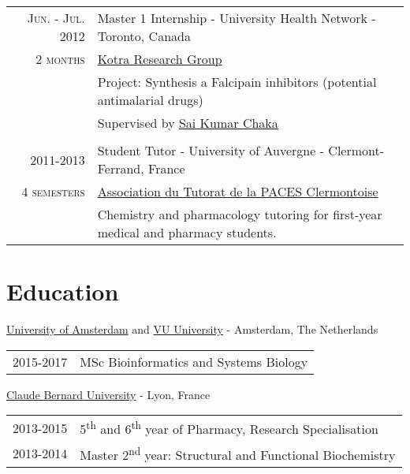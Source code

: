 \documentclass[a4paper, 10pt]{article} %
\begin{document}
\begin{tabular}{r|p{12.5cm}}

\textsc{Jun. - Jul. 2012} & Master 1 Internship - University Health Network - Toronto, Canada \\
\textsc{2 months} & \href{http://kotralab.uhnresearch.ca/}{Kotra Research Group} \\
& \footnotesize{Project: Synthesis a Falcipain inhibitors (potential antimalarial drugs)} \\
& \footnotesize{Supervised by \href{http://www.linkedin.com/in/sai-kumar-chakka-178aa215}{Sai Kumar Chaka}} \\
\multicolumn{2}{c}{} \\


\textsc{2011-2013} & Student Tutor - University of Auvergne - Clermont-Ferrand, France \\
\textsc{4 semesters} & \href{http://atpclermont.fr/atpc/}{Association du Tutorat de la PACES Clermontoise}\\
& \footnotesize{Chemistry and pharmacology tutoring for first-year medical and pharmacy students}. \\

\end{tabular}


\section{Education}

\href{http://www.uva.nl/}{University of Amsterdam} and \href{http://www.vu.nl}{VU University} - Amsterdam, The Netherlands

\begin{tabular}{ll}
\textsc{2015-2017} & MSc Bioinformatics and Systems Biology
\end{tabular}

\href{http://www.univ-lyon1.fr/}{Claude Bernard University} - Lyon, France

\begin{tabular}{ll}
\textsc{2013-2015} & 5\textsuperscript{th} and 6\textsuperscript{th} year of Pharmacy, Research Specialisation \\
\textsc{2013-2014} & Master 2\textsuperscript{nd} year: Structural and Functional Biochemistry
\end{tabular}
\end{document}
